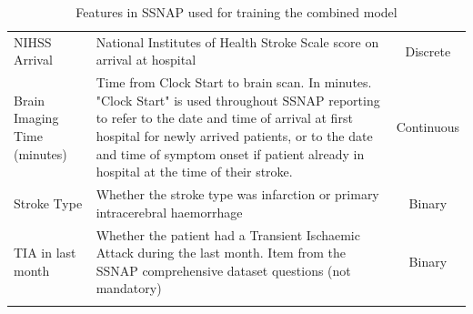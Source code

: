 \documentclass[12pt,a4paper, pdftex]{elsarticle}
\begin{document}
\begin{longtable}{|l|p{8.5cm}|c|}
        NIHSS Arrival & National Institutes of Health Stroke Scale score on arrival at hospital & Discrete \\
        Brain Imaging Time (minutes) & Time from Clock Start to brain scan. In minutes. "Clock Start" is used throughout SSNAP reporting to refer to the date and time of arrival at first hospital for newly arrived patients, or to the date and time of symptom onset if patient already in hospital at the time of their stroke. & Continuous \\
        Stroke Type & Whether the stroke type was infarction or primary intracerebral haemorrhage & Binary \\
        TIA in last month & Whether the patient had a Transient Ischaemic Attack during the last month. Item from the SSNAP comprehensive dataset questions (not mandatory) & Binary \\
        \hline
        \caption{Features in SSNAP used for training the combined model}
        \label{tab:S1}       
        \end{longtable}



\end{document}
